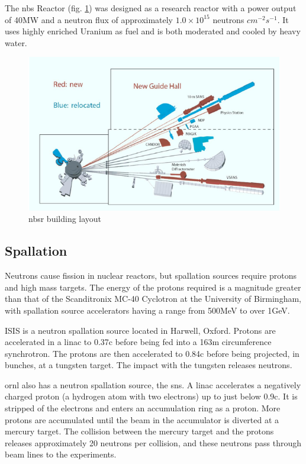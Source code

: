 The \acrlong{nbs} Reactor (fig. \ref{fig:nbsrbeamlines}) was designed as a research reactor with a power output of 40MW and a neutron flux of approximately $1.0 \times 10^{15}$ neutrons $cm^{-2} s^{-1}$.  It uses highly enriched Uranium as fuel and is both moderated and cooled by heavy water. 

\begin{figure}
\begin{center}
\includegraphics[width=.70\linewidth]{chapters/background_activity/images/nbsr.png}
\caption{\acrshort{nbsr} building layout\cite{nbsrhistory}}
\label{fig:nbsrbeamlines}
\end{center}
\end{figure}




\FloatBarrier
\subsection{Spallation}

Neutrons cause fission in nuclear reactors, but spallation sources require protons and high mass targets.  The energy of the protons required is a magnitude greater than that of the Scanditronix MC-40 Cyclotron at the University of Birmingham, with spallation source accelerators having a range from 500MeV to over 1GeV.  

ISIS is a neutron spallation source located in Harwell, Oxford.  Protons are accelerated in a \acrshort{linac} to 0.37c before being fed into a 163m circumference synchrotron.  The protons are then accelerated to 0.84c before being projected, in bunches, at a tungsten target.  The impact with the tungsten releases neutrons\cite{isisneutronsource}.

\acrlong{ornl} also has a neutron spallation source, the \acrshort{sns}.  A \acrshort{linac} accelerates a negatively charged proton (a hydrogen atom with two electrons) up to just below 0.9c.  It is stripped of the electrons and enters an accumulation ring as a proton.  More protons are accumulated until the beam in the accumulator is diverted at a mercury target.  The collision between the mercury target and the protons releases approximately 20 neutrons per collision, and these neutrons pass through beam lines to the experiments. 

